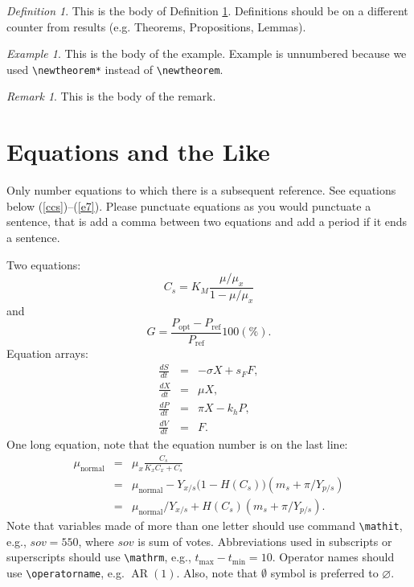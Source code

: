 \documentclass[ecta,nameyear,draft]{econsocart}
\theoremstyle{plain}
\theoremstyle{remark}
\newtheorem{definition}{Definition}
\newtheorem*{example}{Example}
\newtheorem{remark}{Remark}
\begin{document}
\begin{definition}\label{de1}
This is the body of Definition \ref{de1}. Definitions should be on a different counter from results (e.g. Theorems, Propositions, Lemmas).
\end{definition}

\begin{example}
This is the body of the example. Example is unnumbered because we used \verb|\newtheorem*|
instead of \verb|\newtheorem|.
\end{example}

\begin{remark}
This is the body of the remark. 
\end{remark}

\section{Equations and the Like}
Only number equations to which there is a subsequent reference.
See equations below (\ref{ccs})--(\ref{e7}). Please punctuate equations as you would punctuate a sentence, that is add a comma between two equations and add a period if it ends a sentence.

Two equations:
\begin{equation}
    C_{s}  =  K_{M} \frac{\mu/\mu_{x}}{1-\mu/\mu_{x}} \label{ccs}
\end{equation}
and
\begin{equation}
    G = \frac{P_{\mathrm{opt}} - P_{\mathrm{ref}}}{P_{\mathrm{ref}}}  100(\%).
\end{equation}
Equation arrays:
\begin{eqnarray}
  \frac{dS}{dt} & = & - \sigma X + s_{F} F,\\
  \frac{dX}{dt} & = &   \mu    X,\\
  \frac{dP}{dt} & = &   \pi    X - k_{h} P,\\
  \frac{dV}{dt} & = &   F.
\end{eqnarray}
One long equation, note that the equation number is on the last line:
\begin{eqnarray}
 \mu_{\text{normal}} & = & \mu_{x} \frac{C_{s}}{K_{x}C_{x}+C_{s}}  \nonumber\\
                     & = & \mu_{\text{normal}} - Y_{x/s}\bigl(1-H(C_{s})\bigr)(m_{s}+\pi /Y_{p/s})\nonumber\\
                     & = & \mu_{\text{normal}}/Y_{x/s}+ H(C_{s}) (m_{s}+ \pi /Y_{p/s}).\label{e7}
\end{eqnarray}
Note that variables made of more than one letter should use command \verb|\mathit|,
e.g., $\mathit{sov}=550$, where $\mathit{sov}$ is sum of votes. Abbreviations used in subscripts or superscripts should use \verb|\mathrm|,
e.g., $t_{\mathrm{max}}-t_{\mathrm{min}} =10$. Operator names should use \verb|\operatorname|, e.g. $\operatorname{AR}(1)$. Also, note that $\emptyset$ symbol is preferred to $\varnothing$.
\end{document}
